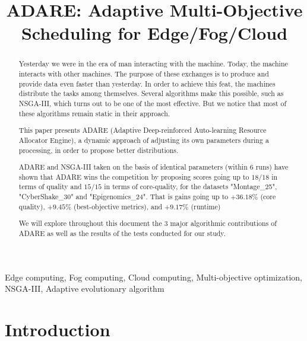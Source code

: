 \documentclass[conference]{IEEEtran}
\begin{document}
\title{ADARE: Adaptive Multi-Objective Scheduling for Edge/Fog/Cloud}

\author{
\and
{}
}

\maketitle

\begin{abstract}
Yesterday we were in the era of man interacting with the machine. Today, the machine interacts with other machines. The purpose of these exchanges is to produce and provide data even faster than yesterday. In order to achieve this feat, the machines distribute the tasks among themselves. Several algorithms make this possible, such as NSGA-III, which turns out to be one of the most effective. But we notice that most of these algorithms remain static in their approach.

This paper presents ADARE (Adaptive Deep-reinforced Auto-learning Resource Allocator Engine), a dynamic approach of adjusting its own parameters during a processing, in order to propose better distributions.

ADARE and NSGA-III taken on the basis of identical parameters (within 6 runs) have shown that ADARE wins the competition by proposing scores going up to $18/18$ in terms of quality and $15/15$ in terms of core-quality, for the datasets "Montage\_25", "CyberShake\_30" and "Epigenomics\_24". That is gains going up to $+36.18\%$ (core quality), $+9.45\%$ (best-objective metrics), and $+9.17\%$ (runtime)

We will explore throughout this document the 3 major algorithmic contributions of ADARE as well as the results of the tests conducted for our study.
\end{abstract}

\begin{IEEEkeywords}
Edge computing, Fog computing, Cloud computing, Multi-objective optimization, NSGA-III, Adaptive evolutionary algorithm
\end{IEEEkeywords}

\section{Introduction}
\end{document}
